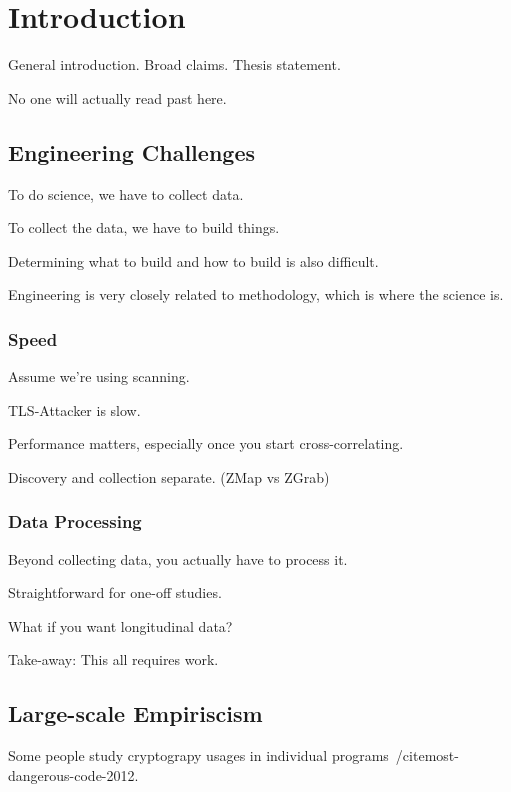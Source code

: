 



\chapter{Introduction}

General introduction. Broad claims. Thesis statement.

No one will actually read past here.

\section{Engineering Challenges}

To do science, we have to collect data.

To collect the data, we have to build things.

Determining what to build and how to build is also difficult.

Engineering is very closely related to methodology, which is where the science is.

\subsection{Speed}

Assume we're using scanning.

TLS-Attacker is slow.

Performance matters, especially once you start cross-correlating.

Discovery and collection separate. (ZMap vs ZGrab)

\subsection{Data Processing}

Beyond collecting data, you actually have to process it.

Straightforward for one-off studies.

What if you want longitudinal data?

Take-away: This all requires work.

\section{Large-scale Empiriscism}

Some people study cryptograpy usages in individual programs~/cite{most-dangerous-code-2012}.

